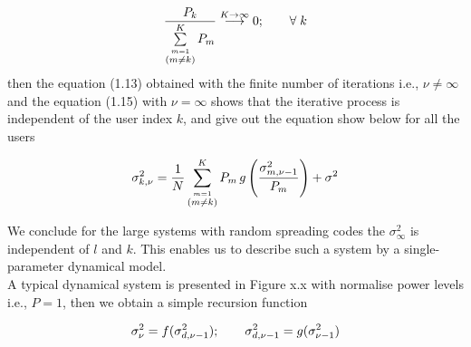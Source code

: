 \begin{equation}
\frac{\hbox{$P_k$}}{\hbox{$\sum\limits_{\stackrel{m=1}{(m\neq k)}}^{K}P_m$}}\stackrel{K\rightarrow \infty}{\longrightarrow}0;\hspace{7mm}\forall\; k
\end{equation}
then the equation (1.13) obtained with the finite number of iterations i.e., $\nu\neq \infty$ and the equation (1.15) with $\nu= \infty$ shows that the iterative process is independent of the user index $k$, and give out the equation show below for all the users

\begin{equation}
\sigma_{k,\nu}^2=\frac{\hbox{$1$}}{\hbox{$N$}}\sum\limits_{\stackrel{m=1}{(m\neq k)}}^{K} P_m\,g\left(\frac{\hbox{$\sigma_{m,\nu-1}^2$}}{\hbox{$P_m$}}\right)+\sigma^2
\end{equation}

We conclude for the large systems with random spreading codes the $\sigma_{\infty}^2$ is independent of $l$ and $k$. This enables us to describe such a system by a single-parameter dynamical model. \\

A typical dynamical system is presented in Figure x.x with normalise power levels i.e., $P=1$, then we obtain a simple recursion function

\begin{equation}
\sigma_{\nu}^2=f(\sigma_{d,\nu-1}^2);\hspace{7mm}\sigma_{d,\nu-1}^2=g(\sigma_{\nu-1}^2)
\end{equation}


